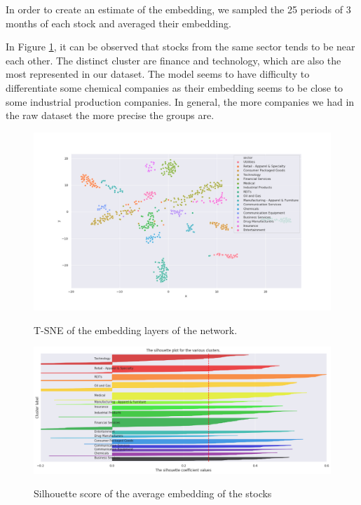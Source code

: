 \documentclass[a4paper,twoside]{article}
\begin{document}
In order to create an estimate of the embedding, we sampled the 25 periods of
3 months of each stock and averaged their embedding. 

In Figure \ref{fig:tsne-embedding}, it can be observed that stocks from the
same sector tends to be near each other. The distinct cluster are finance and
technology, which are also the most represented in our dataset. The model
seems to have difficulty to differentiate some chemical companies as their
embedding seems to be close to some industrial production companies. In
general, the more companies we had in the raw dataset the more precise the
groups are.

\begin{landscape}
  \begin{figure}    
  \begin{center}
    \label{fig:tsne-embedding}
    \includegraphics[height=\textheight]{./figures/tsne.png}
    \caption{T-SNE of the embedding layers of the network.}
    \end{center}
  \end{figure}

  \begin{figure}    
  \begin{center}
    \label{fig:silhouette-score}
    \includegraphics[height=\textheight]{./figures/silouhette_score}
    \caption{Silhouette score of the average embedding of the stocks}
    \end{center}
  \end{figure}
\end{landscape}
\end{document}
